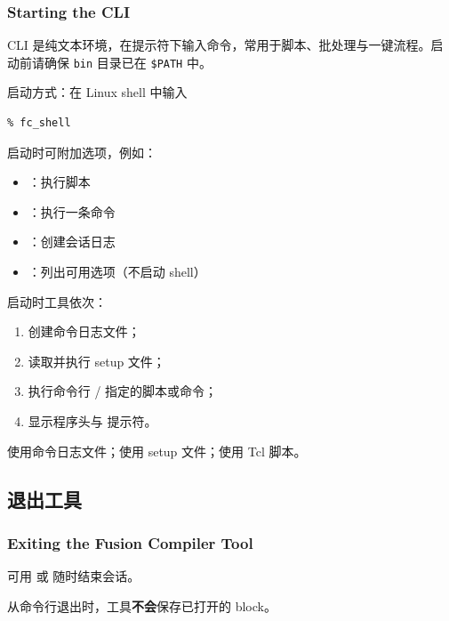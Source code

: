 \subsubsection*{Starting the CLI}

CLI 是纯文本环境，在提示符下输入命令，常用于脚本、批处理与一键流程。启动前请确保 \texttt{bin} 目录已在 \texttt{\$PATH} 中。

启动方式：在 Linux shell 中输入
\begin{lstlisting}
% fc_shell
\end{lstlisting}

启动时可附加选项，例如：
\begin{itemize}
  \item {}：执行脚本
  \item {}：执行一条命令
  \item {}：创建会话日志
  \item {}：列出可用选项（不启动 shell）
\end{itemize}

启动时工具依次：
\begin{enumerate}
  \item 创建命令日志文件；
  \item 读取并执行 setup 文件；
  \item 执行命令行 / 指定的脚本或命令；
  \item 显示程序头与  提示符。
\end{enumerate}

\begin{seeAlsoBox}
使用命令日志文件；使用 setup 文件；使用 Tcl 脚本。
\end{seeAlsoBox}

\subsection{退出工具}
\subsubsection*{Exiting the Fusion Compiler Tool}

可用  或  随时结束会话。

\begin{noteBox}
从命令行退出时，工具\textbf{不会}保存已打开的 block。
\end{noteBox}

